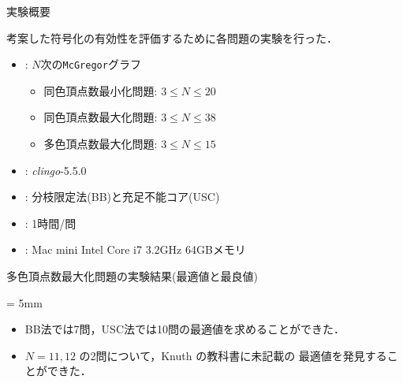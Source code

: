 \documentclass[dvipdfmx,11pt]{beamer}
\newcommand{\code}[1]{\lstinline[basicstyle=\ttfamily]{#1}}
\begin{document}
\begin{frame}{実験概要}
 \begin{block}{}\centering
   考案した符号化の有効性を評価するために各問題の実験を行った．
 \end{block}
 \vfill
 \begin{itemize}
 \item {}: $N$次の\code{McGregor}グラフ
   \begin{itemize}
   \item 同色頂点数最小化問題: $3 \leq N\leq 20$
   \item 同色頂点数最大化問題: $3 \leq N\leq 38$
   \item 多色頂点数最大化問題: $3 \leq N\leq 15$
   \end{itemize}
 \item {}: \textit{clingo}-5.5.0
 \item {}: 分枝限定法(BB)と充足不能コア(USC)
 \item {}: 1時間/問
 \item {}: Mac mini Intel Core i7 3.2GHz 64GBメモリ  
 \end{itemize}
\end{frame}
\begin{frame}{多色頂点数最大化問題の実験結果(最適値と最良値)}
 
 \begin{center}
     \tabcolsep = 5mm
     \renewcommand{\arraystretch}{0.9}
     
 \end{center}

 \begin{itemize}
 \item BB法では7問，USC法では10問の最適値を求めることができた．
 \item $N = 11,12$ の2問について，Knuth の教科書に未記載の
   最適値を発見することができた．
 \end{itemize}
\end{frame}
\end{document}
